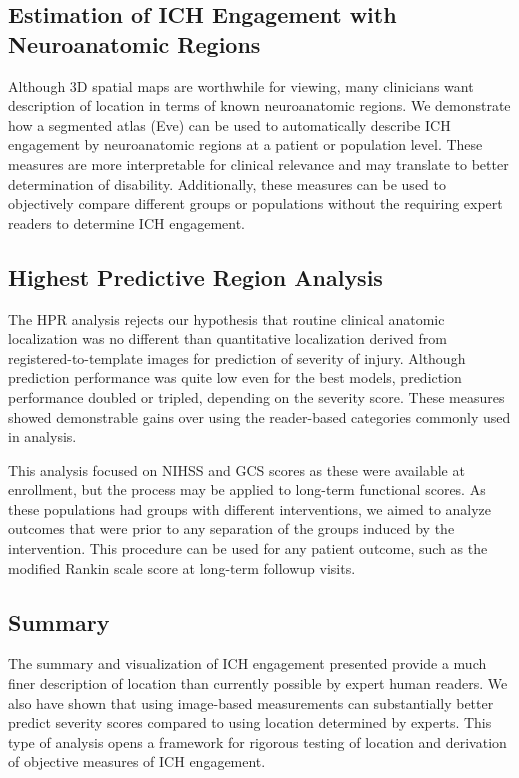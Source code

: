 \documentclass[10pt]{article}\usepackage[]{graphicx}\usepackage[]{color}
\begin{document}
\subsection{Estimation of ICH Engagement with Neuroanatomic Regions}
Although 3D spatial maps are worthwhile for viewing, many clinicians want description of location in terms of known neuroanatomic regions.  We demonstrate how a segmented atlas (Eve) can be used to automatically describe ICH engagement by neuroanatomic regions at a patient or population level.  These measures are more interpretable for clinical relevance and may translate to better determination of disability.  Additionally, these measures can be used to objectively compare different groups or populations without the requiring expert readers to determine ICH engagement.


\subsection{Highest Predictive Region Analysis}

The HPR analysis rejects our hypothesis that routine clinical anatomic localization was no different than quantitative localization derived from registered-to-template images for prediction of severity of injury. Although prediction performance was quite low even for the best models, prediction performance doubled or tripled, depending on the severity score.  These measures showed demonstrable gains over using the reader-based categories commonly used in analysis.

This analysis focused on NIHSS and GCS scores as these were available at enrollment, but the process may be applied to long-term functional scores.  As these populations had groups with different interventions, we aimed to analyze outcomes that were prior to any separation of the groups induced by the intervention.    This procedure can be used for any patient outcome, such as the modified Rankin scale score \citep{rankin_cerebral_1957, swieten_interobserver_1988} at long-term followup visits. 



\subsection{Summary}
The summary and visualization of ICH engagement presented provide a much finer description of location than currently possible by expert human readers.  We also have shown that using image-based measurements can substantially better predict severity scores compared to using location determined by experts.  This type of analysis opens a framework for rigorous testing of location and derivation of objective measures of ICH engagement.  
\end{document}
